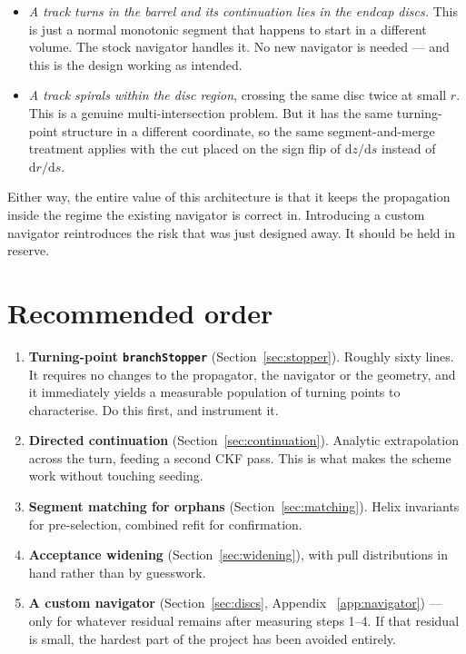 \documentclass[11pt,a4paper]{article}
\newcommand{\code}[1]{\texttt{\small #1}}
\begin{document}
\begin{itemize}
\item \emph{A track turns in the barrel and its continuation lies in the endcap
  discs.} This is just a normal monotonic segment that happens to start in a
  different volume. The stock navigator handles it. No new navigator is needed
  --- and this is the design working as intended.
\item \emph{A track spirals within the disc region}, crossing the same disc
  twice at small $r$. This is a genuine multi-intersection problem. But it has
  the same turning-point structure in a different coordinate, so the same
  segment-and-merge treatment applies with the cut placed on the sign flip of
  $\mathrm{d}z/\mathrm{d}s$ instead of $\mathrm{d}r/\mathrm{d}s$.
\end{itemize}

\noindent
Either way, the entire value of this architecture is that it keeps the
propagation inside the regime the existing navigator is correct in. Introducing
a custom navigator reintroduces the risk that was just designed away. It should
be held in reserve.

\section{Recommended order}

\begin{enumerate}[label=\textbf{\arabic*.}]
\item \textbf{Turning-point \code{branchStopper}} (Section~\ref{sec:stopper}).
  Roughly sixty lines. It requires no changes to the propagator, the navigator
  or the geometry, and it immediately yields a measurable population of turning
  points to characterise. Do this first, and instrument it.
\item \textbf{Directed continuation} (Section~\ref{sec:continuation}). Analytic
  extrapolation across the turn, feeding a second CKF pass. This is what makes
  the scheme work without touching seeding.
\item \textbf{Segment matching for orphans} (Section~\ref{sec:matching}). Helix
  invariants for pre-selection, combined refit for confirmation.
\item \textbf{Acceptance widening} (Section~\ref{sec:widening}), with pull
  distributions in hand rather than by guesswork.
\item \textbf{A custom navigator} (Section~\ref{sec:discs}, Appendix~%
  \ref{app:navigator}) --- only for whatever residual remains after measuring
  steps 1--4. If that residual is small, the hardest part of the project has
  been avoided entirely.
\end{enumerate}
\end{document}

